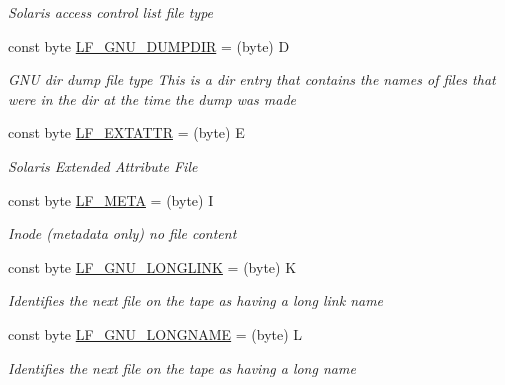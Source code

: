 \begin{DoxyCompactItemize}
\begin{DoxyCompactList}\small\item\em Solaris access control list file type \end{DoxyCompactList}\item 
const byte \hyperlink{class_i_c_sharp_code_1_1_sharp_zip_lib_1_1_tar_1_1_tar_header_ae34609a8fecc9ba4e068ade2a1f64726}{L\+F\+\_\+\+G\+N\+U\+\_\+\+D\+U\+M\+P\+D\+IR} = (byte) \textquotesingle{}D\textquotesingle{}
\begin{DoxyCompactList}\small\item\em G\+NU dir dump file type This is a dir entry that contains the names of files that were in the dir at the time the dump was made \end{DoxyCompactList}\item 
const byte \hyperlink{class_i_c_sharp_code_1_1_sharp_zip_lib_1_1_tar_1_1_tar_header_a3a95278f668e46f65c4c186e8854d18c}{L\+F\+\_\+\+E\+X\+T\+A\+T\+TR} = (byte) \textquotesingle{}E\textquotesingle{}
\begin{DoxyCompactList}\small\item\em Solaris Extended Attribute File \end{DoxyCompactList}\item 
const byte \hyperlink{class_i_c_sharp_code_1_1_sharp_zip_lib_1_1_tar_1_1_tar_header_ab975deeaafb75550e6e07bb1732d5183}{L\+F\+\_\+\+M\+E\+TA} = (byte) \textquotesingle{}I\textquotesingle{}
\begin{DoxyCompactList}\small\item\em Inode (metadata only) no file content \end{DoxyCompactList}\item 
const byte \hyperlink{class_i_c_sharp_code_1_1_sharp_zip_lib_1_1_tar_1_1_tar_header_a43d7c5c9f41a631f159a0ef990e13b64}{L\+F\+\_\+\+G\+N\+U\+\_\+\+L\+O\+N\+G\+L\+I\+NK} = (byte) \textquotesingle{}K\textquotesingle{}
\begin{DoxyCompactList}\small\item\em Identifies the next file on the tape as having a long link name \end{DoxyCompactList}\item 
const byte \hyperlink{class_i_c_sharp_code_1_1_sharp_zip_lib_1_1_tar_1_1_tar_header_ad31c41809644bc900dae3f673327ca2e}{L\+F\+\_\+\+G\+N\+U\+\_\+\+L\+O\+N\+G\+N\+A\+ME} = (byte) \textquotesingle{}L\textquotesingle{}
\begin{DoxyCompactList}\small\item\em Identifies the next file on the tape as having a long name \end{DoxyCompactList}\item 

\end{DoxyCompactItemize}

